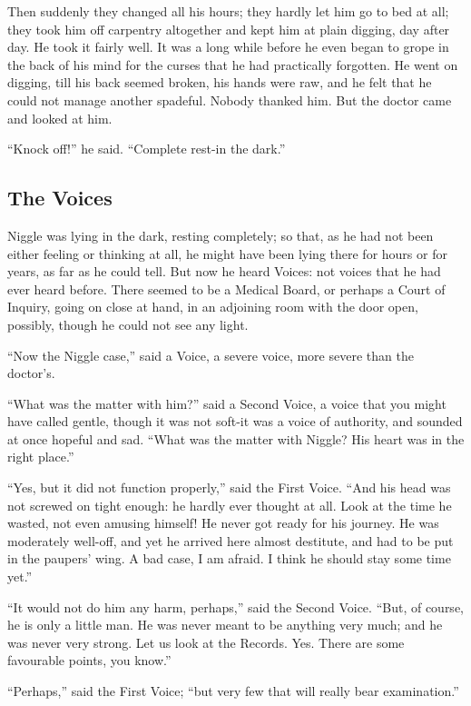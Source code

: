 \documentclass[english]{scrartcl}
\begin{document}
Then suddenly they changed all his hours; they hardly let him go to bed at all; they took him off carpentry altogether and kept him at plain digging, day after day. He took it fairly well. It was a long while before he even began to grope in the back of his mind for the curses that he had practically forgotten. He went on digging, till his back seemed broken, his hands were raw, and he felt that he could not manage another spadeful. Nobody thanked him. But the doctor came and looked at him.

“Knock off!” he said. “Complete rest-in the dark.”

\subsection*{The Voices}

Niggle was lying in the dark, resting completely; so that, as he had not been either feeling or thinking at all, he might have been lying there for hours or for years, as far as he could tell. But now he heard Voices: not voices that he had ever heard before. There seemed to be a Medical Board, or perhaps a Court of Inquiry, going on close at hand, in an adjoining room with the door open, possibly, though he could not see any light.

“Now the Niggle case,” said a Voice, a severe voice, more severe than the doctor’s.

“What was the matter with him?” said a Second Voice, a voice that you might have called gentle, though it was not soft-it was a voice of authority, and sounded at once hopeful and sad. “What was the matter with Niggle? His heart was in the right place.”

“Yes, but it did not function properly,” said the First Voice. “And his head was not screwed on tight enough: he hardly ever thought at all. Look at the time he wasted, not even amusing himself! He never got ready for his journey. He was moderately well-off, and yet he arrived here almost destitute, and had to be put in the paupers’ wing. A bad case, I am afraid. I think he should stay some time yet.”

“It would not do him any harm, perhaps,” said the Second Voice. “But, of course, he is only a little man. He was never meant to be anything very much; and he was never very strong. Let us look at the Records. Yes. There are some favourable points, you know.”

“Perhaps,” said the First Voice; “but very few that will really bear examination.”
\end{document}
